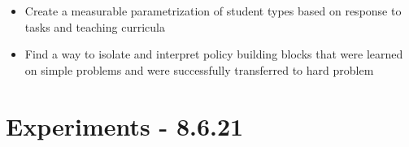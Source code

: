 \documentclass[letterpaper]{article}
\theoremstyle{definition}
\begin{document}
\begin{itemize}
	\item Create a measurable parametrization of student types based on response to tasks and teaching curricula
	\item Find a way to isolate and interpret policy building blocks that were learned on simple problems and were successfully transferred to hard problem
\end{itemize}

\section{Experiments - 8.6.21} \label{sec:experiment}
\end{document}
